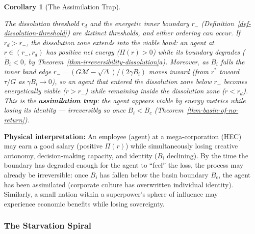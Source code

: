 \documentclass[11pt]{article}
\theoremstyle{plain}
\newtheorem{corollary}[theorem]{Corollary}
\theoremstyle{definition}
\theoremstyle{remark}
\let\origsubsubsection\subsubsection
\renewcommand{\subsubsection}{\needspace{4\baselineskip}\origsubsubsection}
\begin{document}
\begin{corollary}[The Assimilation Trap]
\label{cor-assimilation-trap}

The dissolution threshold $r_d$ and the energetic inner boundary $r_-$ (Definition~\ref{def-dissolution-threshold}) are distinct thresholds, and either ordering can occur. If $r_d > r_-$, the dissolution zone extends into the viable band: an agent at $r \in (r_-, r_d)$ has positive net energy ($\Pi(r) > 0$) while its boundary degrades ($\dot{B}_i < 0$, by Theorem~\ref{thm-irreversibility-dissolution}a). Moreover, as $B_i$ falls the inner band edge $r_- = (G\mathcal{M} - \sqrt{\Delta})/(2\gamma B_i)$ moves inward (from $r^*$ toward $\tau/G$ as $\gamma B_i \to 0$), so an agent that entered the dissolution zone below $r_-$ becomes energetically viable ($r > r_-$) while remaining inside the dissolution zone ($r < r_d$). This is the \textbf{assimilation trap}: the agent appears viable by energy metrics while losing its identity — irreversibly so once $B_i < B_c$ (Theorem~\ref{thm-basin-of-no-return}).
\end{corollary}

\textbf{Physical interpretation:} An employee (agent) at a
mega-corporation (HEC) may earn a good salary (positive \(\Pi(r)\))
while simultaneously losing creative autonomy, decision-making capacity,
and identity (\(B_i\) declining). By the time the boundary has degraded
enough for the agent to ``feel'' the loss, the process may already be
irreversible: once \(B_i\) has fallen below the basin boundary \(B_c\),
the agent has been assimilated (corporate culture has overwritten
individual identity). Similarly, a small nation within a superpower's
sphere of influence may experience economic benefits while losing
sovereignty.

\subsubsection{The Starvation Spiral}\label{the-starvation-spiral}
\end{document}
